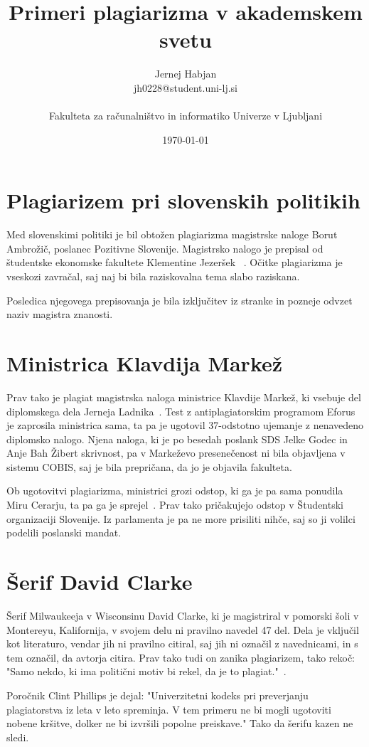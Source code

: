 \documentclass[11pt,a4paper]{article}
\title{Primeri plagiarizma v akademskem svetu}
\author{Jernej Habjan\\
jh0228@student.uni-lj.si\\
\
\\
Fakulteta za računalništvo in informatiko Univerze v Ljubljani
\date{\today}         
}
\begin{document}
\maketitle

\section{Plagiarizem pri slovenskih politikih}


Med slovenskimi politiki je bil obtožen plagiarizma magistrske naloge Borut Ambrožič, poslanec Pozitivne Slovenije. Magistrsko nalogo je prepisal od študentske ekonomske fakultete Klementine Jezeršek
~\cite{politiki_plagiarized}.
Očitke plagiarizma je vseskozi zavračal, saj naj bi bila raziskovalna tema slabo raziskana.

Posledica njegovega prepisovanja je bila izključitev iz stranke in pozneje odvzet naziv magistra znanosti.

\section{Ministrica Klavdija Markež}
Prav tako je plagiat magistrska naloga ministrice Klavdije Markež, ki vsebuje del diplomskega dela Jerneja Ladnika~\cite{markezeva_plagiarized}.
Test z antiplagiatorskim programom Eforus je zaprosila ministrica sama, ta pa je ugotovil 37-odstotno ujemanje z nenavedeno diplomsko nalogo.
Njena naloga, ki je po besedah poslank SDS Jelke Godec in Anje Bah Žibert skrivnost, pa v Markeževo presenečenost ni bila objavljena v sistemu COBIS, saj je bila prepričana, da jo je objavila fakulteta.

Ob ugotovitvi plagiarizma, ministrici grozi odstop, ki ga je pa sama ponudila Miru Cerarju, ta pa ga je sprejel~\cite{markezeva_finished_plagiarized}.
Prav tako pričakujejo odstop v Študentski organizaciji Slovenije.
Iz parlamenta je pa ne more prisiliti nihče, saj so ji volilci podelili poslanski mandat.

\section{Šerif David Clarke}
Šerif Milwaukeeja v Wisconsinu David Clarke, ki je magistriral v pomorski šoli v Montereyu, Kalifornija, v svojem delu ni pravilno navedel 47 del.
Dela je vključil kot literaturo, vendar jih ni pravilno citiral, saj jih ni označil z navednicami, in s tem označil, da avtorja citira.
Prav tako tudi on zanika plagiarizem, tako rekoč: "Samo nekdo, ki ima politični motiv bi rekel, da je to plagiat."~\cite{sherrif_plagiarized}.

Poročnik Clint Phillips je dejal: "Univerzitetni kodeks pri preverjanju plagiatorstva iz leta v leto spreminja.
V tem primeru ne bi mogli ugotoviti nobene kršitve, dolker ne bi izvršili popolne preiskave."
Tako da šerifu kazen ne sledi.




\end{document}
